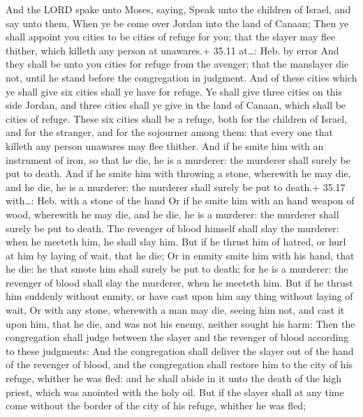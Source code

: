  And the LORD spake unto Moses, saying, 
Speak unto the children of Israel, and say unto them, When ye be come
over Jordan into the land of Canaan;  Then ye shall appoint
you cities to be cities of refuge for you; that the slayer may flee
thither, which killeth any person at unawares.+ 35.11 at\ldots: Heb. by
error  And they shall be unto you cities for refuge from
the avenger; that the manslayer die not, until he stand before the
congregation in judgment.  And of these cities which ye
shall give six cities shall ye have for refuge.  Ye shall
give three cities on this side Jordan, and three cities shall ye give in
the land of Canaan, which shall be cities of refuge.  These
six cities shall be a refuge, both for the children of Israel, and for
the stranger, and for the sojourner among them: that every one that
killeth any person unawares may flee thither.  And if he
smite him with an instrument of iron, so that he die, he is a murderer:
the murderer shall surely be put to death.  And if he smite
him with throwing a stone, wherewith he may die, and he die, he is a
murderer: the murderer shall surely be put to death.+ 35.17 with\ldots:
Heb. with a stone of the hand  Or if he smite him with an
hand weapon of wood, wherewith he may die, and he die, he is a murderer:
the murderer shall surely be put to death.  The revenger of
blood himself shall slay the murderer: when he meeteth him, he shall
slay him.  But if he thrust him of hatred, or hurl at him
by laying of wait, that he die;  Or in enmity smite him
with his hand, that he die: he that smote him shall surely be put to
death; for he is a murderer: the revenger of blood shall slay the
murderer, when he meeteth him.  But if he thrust him
suddenly without enmity, or have cast upon him any thing without laying
of wait,  Or with any stone, wherewith a man may die,
seeing him not, and cast it upon him, that he die, and was not his
enemy, neither sought his harm:  Then the congregation
shall judge between the slayer and the revenger of blood according to
these judgments:  And the congregation shall deliver the
slayer out of the hand of the revenger of blood, and the congregation
shall restore him to the city of his refuge, whither he was fled: and he
shall abide in it unto the death of the high priest, which was anointed
with the holy oil.  But if the slayer shall at any time
come without the border of the city of his refuge, whither he was fled;
